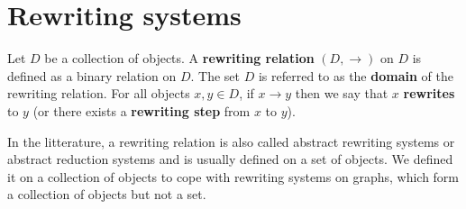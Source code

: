 
\chapter{Rewriting systems}
    \label{sec:category_of_rewriting_systems}      
      \begin{definition}
        \label{def:ars}
        Let $D$ be a collection of objects.  
        A \textbf{rewriting relation} $(D, \rightarrow)$ on $D$ is defined as a binary relation on $D$.  
        The set $D$ is referred to as the \textbf{domain} of the rewriting relation.  
        For all objects $x, y \in D$, if $x \rightarrow y$ then we say that $x$ \textbf{rewrites} to $y$ (or there exists a \textbf{rewriting step} from $x$ to $y$).
    \end{definition}

      In the litterature, a rewriting relation is also called abstract rewriting systems or abstract reduction systems \cite{nipkow1998term,terese2003term} and is usually defined on a set of objects. We defined it on a collection of objects to cope with rewriting systems on graphs, which form a collection of objects but not a set.
       
